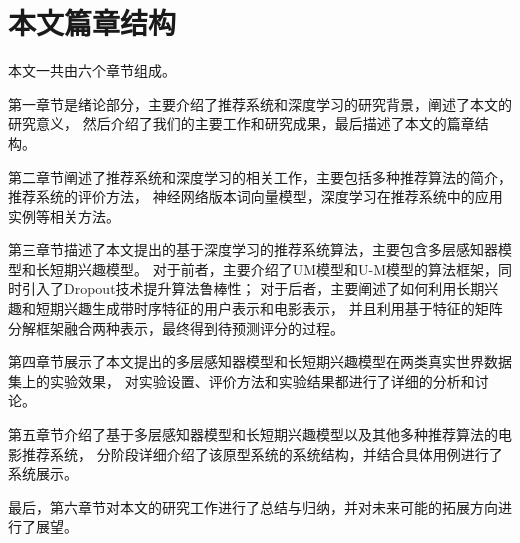 \section{本文篇章结构}
本文一共由六个章节组成。

第一章节是绪论部分，主要介绍了推荐系统和深度学习的研究背景，阐述了本文的研究意义，
然后介绍了我们的主要工作和研究成果，最后描述了本文的篇章结构。

第二章节阐述了推荐系统和深度学习的相关工作，主要包括多种推荐算法的简介，推荐系统的评价方法，
神经网络版本词向量模型，深度学习在推荐系统中的应用实例等相关方法。

第三章节描述了本文提出的基于深度学习的推荐系统算法，主要包含多层感知器模型和长短期兴趣模型。
对于前者，主要介绍了UM模型和U-M模型的算法框架，同时引入了Dropout技术提升算法鲁棒性；
对于后者，主要阐述了如何利用长期兴趣和短期兴趣生成带时序特征的用户表示和电影表示，
并且利用基于特征的矩阵分解框架融合两种表示，最终得到待预测评分的过程。

第四章节展示了本文提出的多层感知器模型和长短期兴趣模型在两类真实世界数据集上的实验效果，
对实验设置、评价方法和实验结果都进行了详细的分析和讨论。

第五章节介绍了基于多层感知器模型和长短期兴趣模型以及其他多种推荐算法的电影推荐系统，
分阶段详细介绍了该原型系统的系统结构，并结合具体用例进行了系统展示。

最后，第六章节对本文的研究工作进行了总结与归纳，并对未来可能的拓展方向进行了展望。


